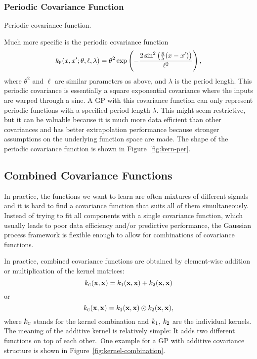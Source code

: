 \subsubsection{Periodic Covariance Function}
\label{sec:periodic-covariance}

\begin{marginfigure}
\setlength\figurewidth{\columnwidth}%
\setlength\figureheight{0.618\figurewidth}%
  \caption{Periodic covariance function.}
  \label{fig:kern-per}
\end{marginfigure}

Much more specific is the periodic covariance function
\cite{MacKay:1998:Introduction}
\begin{equation}
  \label{eq:cov-per}
  \k_\mathsc{p}(x,x';\theta,\ell,\lambda) = \theta^2
  \exp\left(-\frac{2\sin^2\left(\frac{\pi}{\lambda}
  (x-x')\right)}{\ell^2}\right),
\end{equation}
where $\theta^2$ and $\ell$ are similar parameters as above, and $\lambda$ is
the period length. This periodic covariance is essentially a square exponential
covariance where the inputs are warped through a sine. A GP with this covariance
function can only represent periodic functions with a specified period length
$\lambda$. This might seem restrictive, but it can be valuable because it is
much more data efficient than other covariances and has better extrapolation
performance because stronger assumptions on the underlying function space are
made. The shape of the periodic covariance function is shown in
Figure~\ref{fig:kern-per}.

\subsection{Combined Covariance Functions}

In practice, the functions we want to learn are often mixtures of different
signals and it is hard to find a covariance function that suits all of
them simultaneously. Instead of trying to fit all components with a single
covariance function, which usually leads to poor data efficiency and/or
predictive performance, the Gaussian process framework is flexible enough to
allow for combinations of covariance functions.

In practice, combined covariance functions are obtained by element-wise
addition or multiplication of the kernel matrices:
\begin{equation}
  k_{\normalfont\textsc{c}}(\mathbf{x},\mathbf{x}) = k_1(\mathbf{x},\mathbf{x}) +
k_2(\mathbf{x},\mathbf{x})
\end{equation}
or
\begin{equation}
  k_{\normalfont\textsc{c}}(\mathbf{x},\mathbf{x}) = k_1(\mathbf{x},\mathbf{x}) \odot
k_2(\mathbf{x},\mathbf{x}),
\end{equation}
where $k_{\normalfont\textsc{c}}$ stands for the kernel combination and $k_1$,
$k_2$ are the individual kernels. The meaning of the additive kernel is
relatively simple: It adds two different functions on top of each
other.~\cite[]{Rasmussen.Williams:2006:Gaussian}\iss One example for a GP
with additive covariance structure is shown in
Figure~\ref{fig:kernel-combination}.

